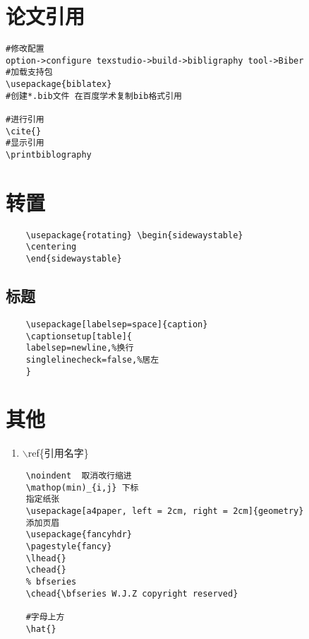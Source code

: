 \documentclass{article}
\begin{document}
\section{论文引用}
\begin{lstlisting}
#修改配置
option->configure texstudio->build->bibligraphy tool->Biber
#加载支持包
\usepackage{biblatex}
#创建*.bib文件 在百度学术复制bib格式引用

#进行引用
\cite{}
#显示引用
\printbiblography
\end{lstlisting}
\section{转置}

\begin{lstlisting}
	\usepackage{rotating} \begin{sidewaystable}
	\centering
	\end{sidewaystable}
\end{lstlisting}
\subsection{标题}
\begin{lstlisting}
	\usepackage[labelsep=space]{caption}
	\captionsetup[table]{
	labelsep=newline,%换行
	singlelinecheck=false,%居左
	}
\end{lstlisting}
\section{其他}
	\begin{enumerate}[引用：]
		\item $\backslash$ref\{引用名字\}
	\end{enumerate}
	\begin{lstlisting}
	\noindent  取消改行缩进
	\mathop(min)_{i,j} 下标
	指定纸张
	\usepackage[a4paper, left = 2cm, right = 2cm]{geometry} 
	添加页眉
	\usepackage{fancyhdr}
	\pagestyle{fancy}
	\lhead{}
	\chead{}
	% bfseries
	\chead{\bfseries W.J.Z copyright reserved}
	
	#字母上方
	\hat{}
	\end{lstlisting}
\end{document}
